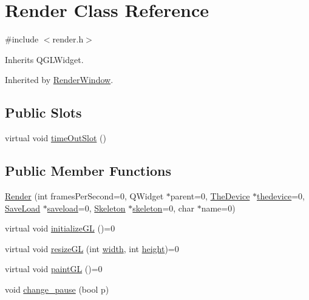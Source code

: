 \hypertarget{class_render}{\section{Render Class Reference}
\label{class_render}
}


{\ttfamily \#include $<$render.\+h$>$}



Inherits Q\+G\+L\+Widget.



Inherited by \hyperlink{class_render_window}{Render\+Window}.

\subsection*{Public Slots}
\begin{DoxyCompactItemize}
\item 
virtual void \hyperlink{class_render_ae2ecac1e840106615081b6f956f83755}{time\+Out\+Slot} ()
\end{DoxyCompactItemize}
\subsection*{Public Member Functions}
\begin{DoxyCompactItemize}
\item 
\hyperlink{class_render_ae6d46e7398a9b7901a797088815fba73}{Render} (int frames\+Per\+Second=0, Q\+Widget $\ast$parent=0, \hyperlink{class_the_device}{The\+Device} $\ast$\hyperlink{class_render_aea72c3cd7f9b31257d99cd1be92fe550}{thedevice}=0, \hyperlink{class_save_load}{Save\+Load} $\ast$\hyperlink{class_render_ae359d4eb07503161a339ad8bfd79685e}{saveload}=0, \hyperlink{class_skeleton}{Skeleton} $\ast$\hyperlink{class_render_aa6c02e21d3907a61880c5b3d723e588f}{skeleton}=0, char $\ast$name=0)
\item 
virtual void \hyperlink{class_render_ab033459d17cea5b9d2ee1f42970fdaa0}{initialize\+G\+L} ()=0
\item 
virtual void \hyperlink{class_render_aa6fe6cc6f3d5ed00e490703a60fd4e4d}{resize\+G\+L} (int \hyperlink{class_render_a54b5039b8443453e3321997f5697a711}{width}, int \hyperlink{class_render_aa1d23d7ff6a91e29b4d001fdbe185e16}{height})=0
\item 
virtual void \hyperlink{class_render_a5f618b419d8381bd7b9682996695a3e8}{paint\+G\+L} ()=0
\item 
void \hyperlink{class_render_a8c1d23f58ded9111166e7ba963703f0f}{change\+\_\+pause} (bool p)
\end{DoxyCompactItemize}
